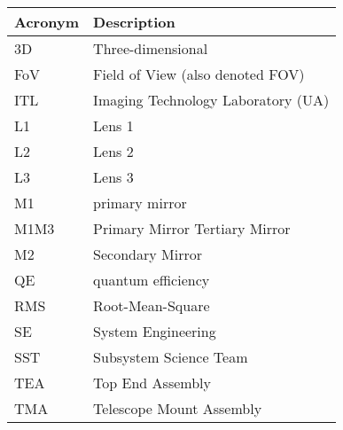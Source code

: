 \addtocounter{table}{-1}
\begin{longtable}{p{}p{}}\hline
\textbf{Acronym} & \textbf{Description}  \\\hline

3D & Three-dimensional \\\hline
FoV & Field of View (also denoted FOV) \\\hline
ITL & Imaging Technology Laboratory (UA) \\\hline
L1 & Lens 1 \\\hline
L2 & Lens 2 \\\hline
L3 & Lens 3 \\\hline
M1 & primary mirror \\\hline
M1M3 & Primary Mirror Tertiary Mirror \\\hline
M2 & Secondary Mirror \\\hline
QE & quantum efficiency \\\hline
RMS & Root-Mean-Square \\\hline
SE & System Engineering \\\hline
SST & Subsystem Science Team \\\hline
TEA & Top End Assembly \\\hline
TMA & Telescope Mount Assembly \\\hline
\end{longtable}
